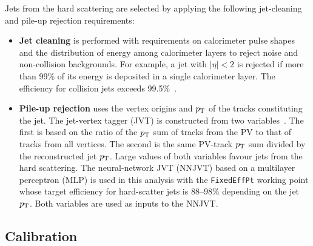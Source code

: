 Jets from the hard scattering are selected by applying the following jet-cleaning and pile-up rejection requirements:
\begin{itemize}
    \item \textbf{Jet cleaning} is performed with requirements on calorimeter pulse shapes and the distribution of energy among calorimeter layers to reject noise and non-collision backgrounds. For example, a jet with $|\eta|<2$ is rejected if more than 99\% of its energy is deposited in a single calorimeter layer. The efficiency for collision jets exceeds 99.5\%~\cite{ATLAS2015JetCleaning}.
    \item \textbf{Pile-up rejection} uses the vertex origins and $p_{\mathrm{T}}$ of the tracks constituting the jet.
    The jet-vertex tagger (JVT) is constructed from two variables~\cite{ATLAS2016PileupMitigation}.
    The first is based on the ratio of the $p_{\mathrm{T}}$ sum of tracks from the PV to that of tracks from all vertices.
    The second is the same PV-track $p_{\mathrm{T}}$ sum divided by the reconstructed jet $p_{\mathrm{T}}$.
    Large values of both variables favour jets from the hard scattering.
    The neural-network JVT (NNJVT) based on a multilayer perceptron (MLP) is used in this analysis with the \texttt{FixedEffPt} working point whose target efficiency for hard-scatter jets is $88$--$98\%$ depending on the jet $p_{\mathrm{T}}$. Both variables are used as inputs to the NNJVT.
\end{itemize}

\subsection{Calibration}

